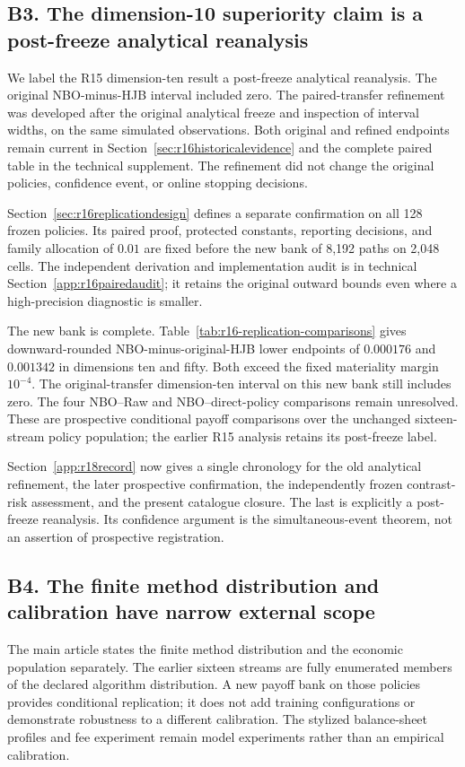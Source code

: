 \subsection*{B3. The dimension-10 superiority claim is a post-freeze analytical reanalysis}\label{resp:B3}
We label the R15 dimension-ten result a post-freeze analytical reanalysis. The original NBO-minus-HJB interval included zero. The paired-transfer refinement was developed after the original analytical freeze and inspection of interval widths, on the same simulated observations. Both original and refined endpoints remain current in Section~\ref{sec:r16historicalevidence} and the complete paired table in the technical supplement. The refinement did not change the original policies, confidence event, or online stopping decisions.

Section~\ref{sec:r16replicationdesign} defines a separate confirmation on all 128 frozen policies. Its paired proof, protected constants, reporting decisions, and family allocation of $0.01$ are fixed before the new bank of 8,192 paths on 2,048 cells. The independent derivation and implementation audit is in technical Section~\ref{app:r16pairedaudit}; it retains the original outward bounds even where a high-precision diagnostic is smaller.

The new bank is complete. Table~\ref{tab:r16-replication-comparisons} gives downward-rounded NBO-minus-original-HJB lower endpoints of $0.000176$ and $0.001342$ in dimensions ten and fifty. Both exceed the fixed materiality margin $10^{-4}$. The original-transfer dimension-ten interval on this new bank still includes zero. The four NBO--Raw and NBO--direct-policy comparisons remain unresolved. These are prospective conditional payoff comparisons over the unchanged sixteen-stream policy population; the earlier R15 analysis retains its post-freeze label.


Section~\ref{app:r18record} now gives a single chronology for the old analytical refinement, the later prospective confirmation, the independently frozen contrast-risk assessment, and the present catalogue closure. The last is explicitly a post-freeze reanalysis. Its confidence argument is the simultaneous-event theorem, not an assertion of prospective registration.

\subsection*{B4. The finite method distribution and calibration have narrow external scope}\label{resp:B4}
The main article states the finite method distribution and the economic population separately. The earlier sixteen streams are fully enumerated members of the declared algorithm distribution. A new payoff bank on those policies provides conditional replication; it does not add training configurations or demonstrate robustness to a different calibration. The stylized balance-sheet profiles and fee experiment remain model experiments rather than an empirical calibration.

